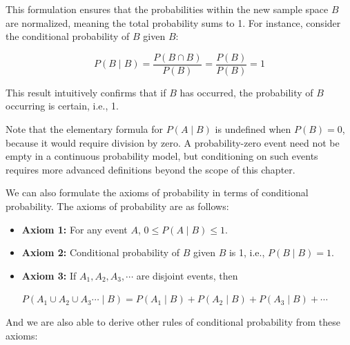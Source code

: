This formulation ensures that the probabilities within the new sample space \( B \) are normalized, meaning the total probability sums to 1. For instance, consider the conditional probability of \( B \) given \( B \):

\[
P(B \mid B) = \frac{P(B \cap B)}{P(B)} = \frac{P(B)}{P(B)} = 1
\]

This result intuitively confirms that if \( B \) has occurred, the probability of \( B \) occurring is certain, i.e., 1.

Note that the elementary formula for \( P(A \mid B) \) is undefined when \( P(B) = 0 \), because it would require division by zero. A probability-zero event need not be empty in a continuous probability model, but conditioning on such events requires more advanced definitions beyond the scope of this chapter.

We can also formulate the axioms of probability in terms of conditional probability. The axioms of probability are as follows:

\begin{axiom}
    \begin{itemize}
        \item \textbf{Axiom 1:} For any event \(A\), \( 0 \leq P(A\mid B) \leq 1 \).
        \item \textbf{Axiom 2:} Conditional probability of $B$ given $B$ is 1, i.e., $P(B \mid B)=1$.
        \item \textbf{Axiom 3:} If \(A_1, A_2, A_3, \cdots\) are disjoint events, then
         
        \hspace*{2.8em}$P\left(A_1 \cup A_2 \cup A_3 \cdots \mid B\right)=P\left(A_1 \mid B\right)+P\left(A_2 \mid B\right)+P\left(A_3 \mid B\right)+\cdots$
    \end{itemize}
\end{axiom}

And we are also able to derive other rules of conditional probability from these axioms:

